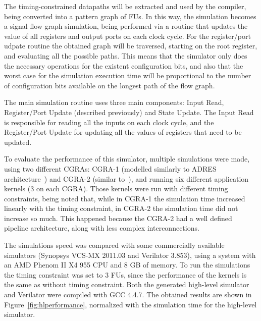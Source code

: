 The timing-constrained datapaths will be extracted and used by the compiler,
being converted into a pattern graph of FUs. In this way, the simulation becomes
a signal flow graph simulation, being performed via a routine that updates the
value of all registers and output ports on each clock cycle. For the
register/port udpate routine the obtained graph will be traversed, starting on
the root register, and evaluating all the possible paths. This means that the
simulator only does the necessary operations for the existent configuration
bits, and also that the worst case for the simulation execution time will be
proportional to the number of configuration bits available on the longest path
of the flow graph.

The main simulation routine uses three main components: Input Read,
Register/Port Update (described previously) and State Update. The Input Read is
responsible for reading all the inputs on each clock cycle, and the
Register/Port Update for updating all the values of registers that need to be
updated.


To evaluate the performance of this simulator, multiple simulations were made,
using two different CGRAs: CGRA-1 (modelled similarly to ADRES architecture~\cite{mei:reconfigurable}) and CGRA-2 (similar to~\cite{chen:flexdet}), and
running six different application kernels (3 on each CGRA). Those kernels were
run with different timing constraints, being noted that, while in CGRA-1 the
simulation time increased linearly with the timing constraint, in CGRA-2 the
simulation time did not increase so much. This happened because the CGRA-2 had a
well defined pipeline architecture, along with less complex interconnections.


The simulations speed was compared with some commercially available simulators
(Synopsys VCS-MX 2011.03 and Verilator 3.853), using a system with an AMD Phenom
II X4 955 CPU and 8 GB of memory. To run the simulations the timing constraint
was set to 3 FUs, since the performance of the kernels is the same as without
timing constraint. Both the generated high-level simulator and Verilator were
compiled with GCC 4.4.7. The obtained results are shown in Figure~\ref{fig:hlperformance}, normalized with the simulation time for the high-level
simulator.


